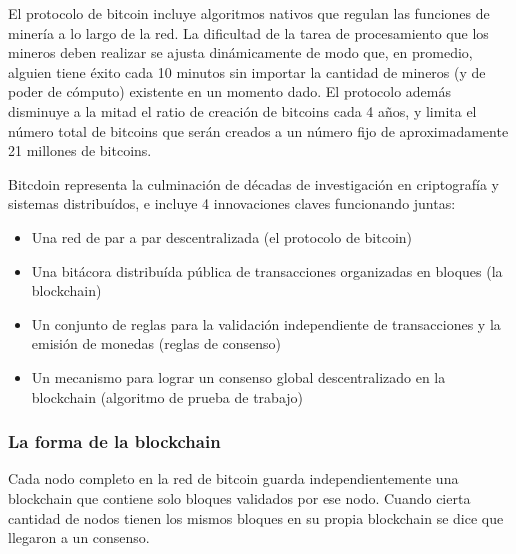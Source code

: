 El protocolo de bitcoin incluye algoritmos nativos que regulan las funciones de minería a lo largo de la
red. La dificultad de la tarea de procesamiento que los mineros deben realizar se ajusta dinámicamente
de modo que, en promedio, alguien tiene éxito cada 10 minutos sin importar la cantidad de mineros (y
de poder de cómputo) existente en un momento dado. El protocolo además disminuye a la mitad el ratio de creación
de bitcoins cada 4 años, y limita el número total de bitcoins que serán creados a un número fijo de
aproximadamente 21 millones de bitcoins.


Bitcdoin representa la culminación de décadas de investigación en criptografía
y sistemas distribuídos, e incluye 4 innovaciones claves funcionando juntas:
\begin{itemize}
  \item Una red de par a par descentralizada (el protocolo de bitcoin)
  \item Una bitácora distribuída pública de transacciones organizadas en bloques (la blockchain)
  \item Un conjunto de reglas para la validación independiente de transacciones y la emisión de monedas (reglas de consenso)
  \item Un mecanismo para lograr un consenso global descentralizado en la blockchain (algoritmo de prueba de trabajo)
\end{itemize}

\subsubsection{La forma de la blockchain}

Cada nodo completo en la red de bitcoin guarda independientemente una blockchain que contiene solo
bloques validados por ese nodo. Cuando cierta cantidad de nodos tienen los mismos bloques en su propia blockchain
se dice que llegaron a un consenso. 

